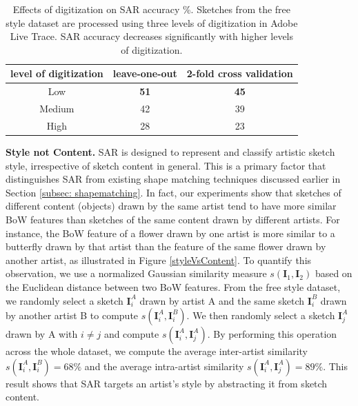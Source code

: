 \vspace{-1mm}
\begin{table}[!htbp]
\caption {Effects of digitization on SAR accuracy \%. Sketches from the free style dataset are processed using three levels of digitization in Adobe Live Trace. SAR accuracy decreases significantly with higher levels of digitization.}
\label{table:digitization}
\vspace{-2mm}
\centering
\small
\begin{tabular}{c | c | c}
level of digitization& leave-one-out & 2-fold cross validation \\ \hline

Low       & \textbf{51} &  \textbf{45}\\
Medium       & 42 &  39\\
High      & 28 &  23\\
\end{tabular}\vspace{-2mm}
\end{table}


\noindent\textbf{Style not Content.} SAR is designed to represent and classify artistic sketch style, irrespective of sketch content in general. This is a primary factor that distinguishes SAR from existing shape matching techniques discussed earlier in Section \ref{subsec: shapematching}. In fact, our experiments show that sketches of different content (objects) drawn by the same artist tend to have more similar BoW features than sketches of the same content drawn by different artists. For instance, the BoW feature of a flower drawn by one artist is more similar to a butterfly drawn by that artist than the feature of the same flower drawn by another artist, as illustrated in Figure \ref{styleVsContent}. To quantify this observation, we use a normalized Gaussian similarity measure $s(\mathbf{I}_1,\mathbf{I}_2)$ based on the Euclidean distance between two BoW features. From the free style dataset, we randomly select a sketch $\mathbf{I}_i^A$ drawn by artist A and the same sketch $\mathbf{I}_i^B$  drawn by another artist B to compute $s(\mathbf{I}_i^A,\mathbf{I}_i^B)$. We then randomly select a sketch $\mathbf{I}_j^A$ drawn by A with $i\neq j$ and compute $s(\mathbf{I}_i^A,\mathbf{I}_j^A)$. By performing this operation across the whole dataset, we compute the average inter-artist similarity $s(\mathbf{I}_i^A,\mathbf{I}_i^B)=68\%$ and the average intra-artist similarity $s(\mathbf{I}_i^A,\mathbf{I}_j^A)=89\%$.  This result shows that SAR targets an artist's style by abstracting it from sketch content.



